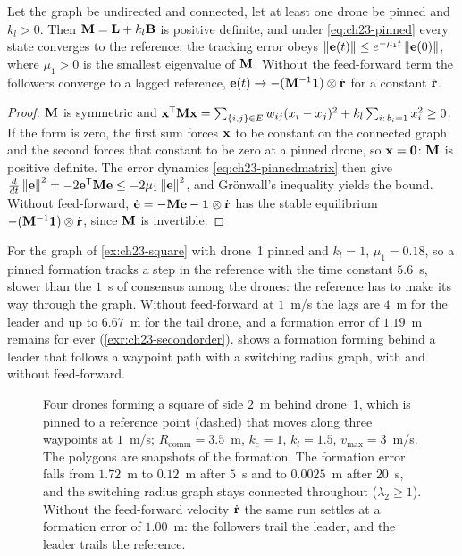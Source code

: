 \begin{proposition}
\label{prop:ch23-leader}
Let the graph be undirected and connected, let at least one drone be pinned
and $k_l > 0$. Then $\mathbf{M} = \mathbf{L} + k_l\mathbf{B}$ is positive definite, and
under \cref{eq:ch23-pinned} every state converges to the reference: the
tracking error obeys $\left\lVert \mathbf{e}(t) \right\rVert \le e^{-\mu_1 t}\left\lVert \mathbf{e}(0) \right\rVert$,
where $\mu_1 > 0$ is the smallest eigenvalue of $\mathbf{M}$. Without the
feed-forward term the followers converge to a lagged reference,
$\mathbf{e}(t) \to -(\mathbf{M}^{-1}\mathbf{1})\otimes\dot{\mathbf{r}}$ for a constant
$\dot{\mathbf{r}}$.
\end{proposition}
\begin{proof}
$\mathbf{M}$ is symmetric and $\mathbf{x}^{\mathsf{T}}\mathbf{M}\mathbf{x} = \sum_{\left\{ i,j \right\}\in E}
w_{ij}(x_i - x_j)^2 + k_l\sum_{i:\,b_i = 1} x_i^2 \ge 0$. If the form is zero, the
first sum forces $\mathbf{x}$ to be constant on the connected graph and the
second forces that constant to be zero at a pinned drone, so $\mathbf{x} =
\mathbf{0}$: $\mathbf{M}$ is positive definite. The error
dynamics \cref{eq:ch23-pinnedmatrix} then give $\frac{d}{dt}\left\lVert \mathbf{e} \right\rVert^2 =
-2\mathbf{e}^{\mathsf{T}}\mathbf{M}\mathbf{e} \le -2\mu_1\left\lVert \mathbf{e} \right\rVert^2$, and Gr\"onwall's
inequality yields the bound. Without feed-forward, $\dot{\mathbf{e}} =
-\mathbf{M}\mathbf{e} - \mathbf{1}\otimes\dot{\mathbf{r}}$ has the stable equilibrium
$-(\mathbf{M}^{-1}\mathbf{1})\otimes\dot{\mathbf{r}}$, since $\mathbf{M}$ is invertible.
\end{proof}

For the graph of \cref{ex:ch23-square} with drone~1 pinned and $k_l = 1$,
$\mu_1 = 0.18$, so a pinned formation tracks a step in the reference with the
time constant $5.6$~s, slower than the $1$~s of consensus among the drones:
the reference has to make its way through the graph. Without feed-forward at
$1$~m/s the lags are $4$~m for the leader and up to $6.67$~m for the tail
drone, and a formation error of $1.19$~m remains for ever
(\cref{exr:ch23-secondorder}).  shows a formation
forming behind a leader that follows a waypoint path with a switching radius
graph, with and without feed-forward.

\begin{figure}[tb]
  \centering
  \caption{Four drones forming a square of side $2$~m behind drone~1, which is
  pinned to a reference point (dashed) that moves along three waypoints at
  $1$~m/s; $R_{\mathrm{comm}} = 3.5$~m, $k_c = 1$, $k_l = 1.5$, $v_{\max} =
  3$~m/s. The polygons are snapshots of the formation. The formation error
  falls from $1.72$~m to $0.12$~m after $5$~s and to $0.0025$~m after $20$~s,
  and the switching radius graph stays connected throughout
  ($\lambda_2 \ge 1$). Without the feed-forward velocity $\dot{\mathbf{r}}$ the
  same run settles at a formation error of $1.00$~m: the followers trail the
  leader, and the leader trails the reference.}
  \label{fig:ch23-leader}
\end{figure}

